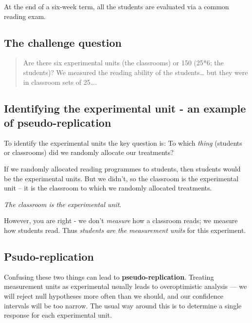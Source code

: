 \documentclass[
]{book}
\begin{document}
At the end of a six-week term, all the students are evaluated via a common reading exam.

\hypertarget{the-challenge-question}{%
\subsection{The challenge question}\label{the-challenge-question}}

\begin{quote}
Are there six experimental units (the classrooms) or 150 (25*6; the students)? We measured the reading ability of the students\ldots{} but they were in classroom sets of 25\ldots.
\end{quote}

\hypertarget{identifying-the-experimental-unit---an-example-of-pseudo-replication}{%
\subsection{\texorpdfstring{Identifying the experimental unit - an example of \textbf{pseudo-replication}}{Identifying the experimental unit - an example of pseudo-replication}}\label{identifying-the-experimental-unit---an-example-of-pseudo-replication}}

To identify the experimental units the key question is: To which \emph{thing} (students or classrooms) did we randomly allocate our treatments?

If we randomly allocated reading programmes to students, then students would be the experimental units. But we didn't, so the classroom is the experimental unit -- it is the classroom to which we randomly allocated treatments.

\emph{The classroom is the experimental unit}.

However, you are right - we don't \emph{measure} how a classroom reads; we measure how students read. Thus \emph{students are the measurement units} for this experiment.

\hypertarget{psudo-replication}{%
\subsection{Psudo-replication}\label{psudo-replication}}

Confusing these two things can lead to \textbf{pseudo-replication}. Treating measurement units as experimental usually leads to overoptimistic analysis --- we will reject null hypotheses more often than we should, and our confidence intervals will be too narrow. The usual way around this is to determine a single response for each experimental unit.
\end{document}

